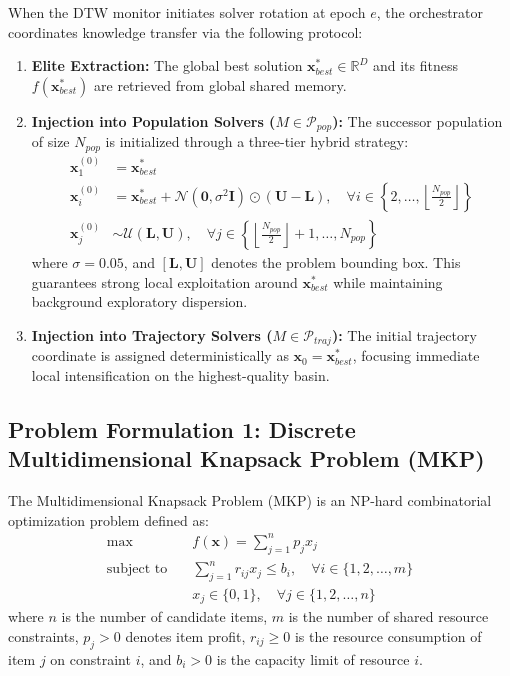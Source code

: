 When the DTW monitor initiates solver rotation at epoch $e$, the orchestrator coordinates knowledge transfer via the following protocol:
\begin{enumerate}
    \item \textbf{Elite Extraction:} The global best solution $\mathbf{x}_{best}^* \in \mathbb{R}^D$ and its fitness $f(\mathbf{x}_{best}^*)$ are retrieved from global shared memory.
    \item \textbf{Injection into Population Solvers ($M \in \mathcal{P}_{pop}$):} The successor population of size $N_{pop}$ is initialized through a three-tier hybrid strategy:
    \begin{align}
    \mathbf{x}_1^{(0)} &= \mathbf{x}_{best}^* \label{eq:elite_inj} \\
    \mathbf{x}_i^{(0)} &= \mathbf{x}_{best}^* + \mathcal{N}\left(\mathbf{0}, \sigma^2 \mathbf{I}\right) \odot (\mathbf{U} - \mathbf{L}), \quad \forall i \in \left\{2, \dots, \left\lfloor \frac{N_{pop}}{2} \right\rfloor \right\} \label{eq:gauss_inj} \\
    \mathbf{x}_j^{(0)} &\sim \mathcal{U}(\mathbf{L}, \mathbf{U}), \quad \forall j \in \left\{\left\lfloor \frac{N_{pop}}{2} \right\rfloor + 1, \dots, N_{pop}\right\} \label{eq:unif_inj}
    \end{align}
    where $\sigma = 0.05$, and $[\mathbf{L}, \mathbf{U}]$ denotes the problem bounding box. This guarantees strong local exploitation around $\mathbf{x}_{best}^*$ while maintaining background exploratory dispersion.
    \item \textbf{Injection into Trajectory Solvers ($M \in \mathcal{P}_{traj}$):} The initial trajectory coordinate is assigned deterministically as $\mathbf{x}_0 = \mathbf{x}_{best}^*$, focusing immediate local intensification on the highest-quality basin.
\end{enumerate}

\subsection{Problem Formulation 1: Discrete Multidimensional Knapsack Problem (MKP)}
\label{sec:mkp_formulation}

The Multidimensional Knapsack Problem (MKP) is an NP-hard combinatorial optimization problem defined as:
\begin{align}
\max \quad & f(\mathbf{x}) = \sum_{j=1}^{n} p_j x_j \label{eq:mkp_obj} \\
\text{subject to} \quad & \sum_{j=1}^{n} r_{ij} x_j \le b_i, \quad \forall i \in \{1, 2, \dots, m\} \label{eq:mkp_cons} \\
& x_j \in \{0, 1\}, \quad \forall j \in \{1, 2, \dots, n\} \label{eq:mkp_vars}
\end{align}
where $n$ is the number of candidate items, $m$ is the number of shared resource constraints, $p_j > 0$ denotes item profit, $r_{ij} \ge 0$ is the resource consumption of item $j$ on constraint $i$, and $b_i > 0$ is the capacity limit of resource $i$.

